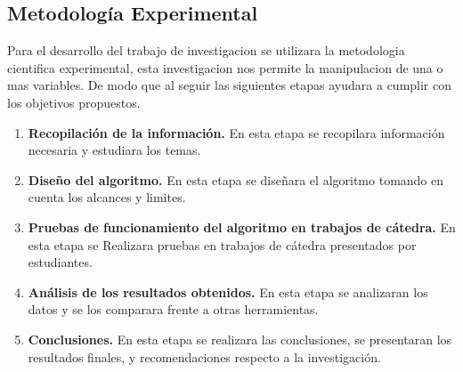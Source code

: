\subsection{Metodología Experimental}
Para el desarrollo del trabajo de investigacion se utilizara la metodologia cientifica experimental, esta investigacion 
nos permite la manipulacion de una o mas variables. De modo que al seguir las siguientes etapas ayudara a cumplir con los objetivos propuestos.
\begin{enumerate}
  \item \textbf{Recopilación de la información.} En esta etapa se recopilara información necesaria y estudiara los temas.
  \item \textbf{Diseño del algoritmo.} En esta etapa se diseñara el algoritmo tomando en cuenta los alcances y limites.
  \item \textbf{Pruebas de funcionamiento del algoritmo en trabajos de cátedra.} En esta etapa se Realizara pruebas en trabajos de cátedra presentados por estudiantes.
  \item \textbf{Análisis de los resultados obtenidos.} En esta etapa se analizaran los datos y se los comparara frente a otras herramientas.
  \item \textbf{Conclusiones.} En esta etapa se realizara las conclusiones, se presentaran los resultados finales, y recomendaciones respecto a la investigación.
\end{enumerate}